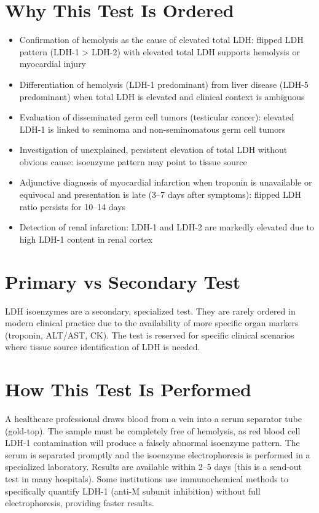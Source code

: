 \section*{Why This Test Is Ordered}
\begin{itemize}
  \item Confirmation of hemolysis as the cause of elevated total LDH: flipped LDH pattern (LDH-1 > LDH-2) with elevated total LDH supports hemolysis or myocardial injury
  \item Differentiation of hemolysis (LDH-1 predominant) from liver disease (LDH-5 predominant) when total LDH is elevated and clinical context is ambiguous
  \item Evaluation of disseminated germ cell tumors (testicular cancer): elevated LDH-1 is linked to seminoma and non-seminomatous germ cell tumors
  \item Investigation of unexplained, persistent elevation of total LDH without obvious cause: isoenzyme pattern may point to tissue source \cite{wolf1986interpretation}
  \item Adjunctive diagnosis of myocardial infarction when troponin is unavailable or equivocal and presentation is late (3--7 days after symptoms): flipped LDH ratio persists for 10--14 days \cite{lott1980serum}
  \item Detection of renal infarction: LDH-1 and LDH-2 are markedly elevated due to high LDH-1 content in renal cortex
\end{itemize}

\section*{Primary vs Secondary Test}
LDH isoenzymes are a secondary, specialized test. They are rarely ordered in modern clinical practice due to the availability of more specific organ markers (troponin, ALT/AST, CK). The test is reserved for specific clinical scenarios where tissue source identification of LDH is needed.

\section*{How This Test Is Performed}
A healthcare professional draws blood from a vein into a serum separator tube (gold-top). The sample must be completely free of hemolysis, as red blood cell LDH-1 contamination will produce a falsely abnormal isoenzyme pattern. The serum is separated promptly and the isoenzyme electrophoresis is performed in a specialized laboratory. Results are available within 2--5 days (this is a send-out test in many hospitals). Some institutions use immunochemical methods to specifically quantify LDH-1 (anti-M subunit inhibition) without full electrophoresis, providing faster results.

